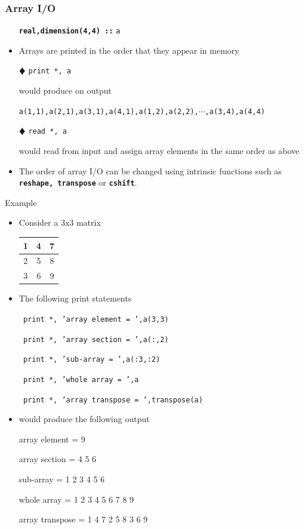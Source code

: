 \documentclass[slidestop,mathserif,compress,xcolor=svgnames]{beamer}
\newcommand{\bftt}[1]{\textbf{\texttt{#1}}}
\newenvironment{bblock}[0]
{
\begin{beamerboxesrounded}[upper=uppercol1,lower=lowercol1,shadow=true]}
{\end{beamerboxesrounded}}
\begin{document}
\begin{frame}[allowframebreaks]
  \frametitle{\small Array I/O}
  \begin{itemize}
    \item[] \textbf{\texttt{real,dimension(4,4) ::}} \texttt{a}
    \item Arrays are printed in the order that they appear in memory
    \item[$\vardiamond$] {\texttt{print *, a}}
    \item[] would produce on output
    \item[] {\texttt{a(1,1),a(2,1),a(3,1),a(4,1),a(1,2),a(2,2),$\cdots$,a(3,4),a(4,4)}}
    \item[$\vardiamond$] {\texttt{read *, a}}
    \item[] would read from input and assign array elements in the same order as above
    \item The order of array I/O can be changed using intrinsic functions such as \bftt{reshape, transpose} or \bftt{cshift}.
  \end{itemize}
  \begin{bblock}{Example}
    \begin{itemize}
      \item Consider a 3x3 matrix
      \begin{center}
        \begin{tabular}{|c|c|c|}
          \hline
          1 & 4 & 7 \\ \hline
          2 & 5 & 8 \\ \hline
          3 & 6 & 9 \\ \hline
        \end{tabular}
      \end{center}
      \item The following print statements
      \item[] {\texttt{ print *, 'array element   = ',a(3,3)}}
      \item[] {\texttt{ print *, 'array section   = ',a(:,2)}}
      \item[] {\texttt{ print *, 'sub-array       = ',a(:3,:2)}}
      \item[] {\texttt{ print *, 'whole array     = ',a}}
      \item[] {\texttt{ print *, 'array transpose = ',transpose(a)}}
      \item would produce the following output
      \item[] array element   = 9
      \item[] array section   = 4 5 6
      \item[] sub-array       = 1 2 3 4 5 6
      \item[] whole array     = 1 2 3 4 5 6 7 8 9
      \item[] array transpose = 1 4 7 2 5 8 3 6 9
    \end{itemize}
  \end{bblock}  
\end{frame}
\end{document}
